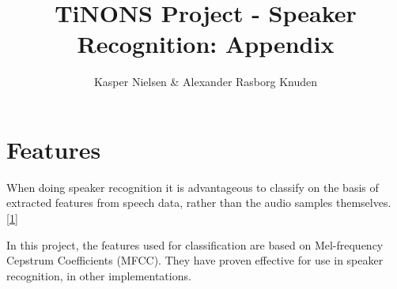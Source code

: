 \documentclass[]{report}
\title{TiNONS Project - Speaker Recognition: Appendix}
\author{Kasper Nielsen \& Alexander Rasborg Knuden}
\begin{document}
\maketitle

\chapter{Features}

When doing speaker recognition it is advantageous to classify on the basis of extracted features from speech data, rather than the audio samples themselves. \ref{1} %

In this project, the features used for classification are based on Mel-frequency Cepstrum Coefficients (MFCC).
They have proven effective for use in speaker recognition, in other implementations.

\end{document}
